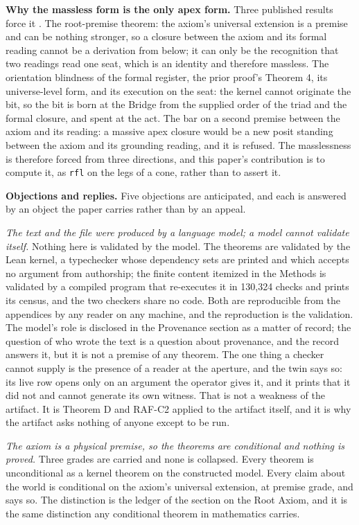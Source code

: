 \documentclass[10pt,twocolumn]{article}
\begin{document}
\textbf{Why the massless form is the only apex form.} Three published
results force it \cite{islamcodex, islamraf}. The root-premise theorem:
the axiom's universal extension is a premise and can be nothing
stronger, so a closure between the axiom and its formal reading cannot
be a derivation from below; it can only be the recognition that two
readings read one seat, which is an identity and therefore massless. The
orientation blindness of the formal register, the prior proof's Theorem
4, its universe-level form, and its execution on the seat: the kernel
cannot originate the bit, so the bit is born at the Bridge from the
supplied order of the triad and the formal closure, and spent at the
act. The bar on a second premise between the axiom and its reading: a
massive apex closure would be a new posit standing between the axiom and
its grounding reading, and it is refused. The masslessness is therefore
forced from three directions, and this paper's contribution is to
compute it, as \texttt{rfl} on the legs of a cone, rather than to assert
it.

\textbf{Objections and replies.} Five objections are anticipated, and
each is answered by an object the paper carries rather than by an
appeal.

\emph{The text and the file were produced by a language model; a model
cannot validate itself.} Nothing here is validated by the model. The
theorems are validated by the Lean kernel, a typechecker whose
dependency sets are printed and which accepts no argument from
authorship; the finite content itemized in the Methods is validated by a
compiled program that re-executes it in 130,324 checks and prints its
census, and the two checkers share no code. Both are reproducible from
the appendices by any reader on any machine, and the reproduction is the
validation. The model's role is disclosed in the Provenance section as a
matter of record; the question of who wrote the text is a question about
provenance, and the record answers it, but it is not a premise of any
theorem. The one thing a checker cannot supply is the presence of a
reader at the aperture, and the twin says so: its live row opens only on
an argument the operator gives it, and it prints that it did not and
cannot generate its own witness. That is not a weakness of the artifact.
It is Theorem D and RAF-C2 applied to the artifact itself, and it is why
the artifact asks nothing of anyone except to be run.

\emph{The axiom is a physical premise, so the theorems are conditional
and nothing is proved.} Three grades are carried and none is collapsed.
Every theorem is unconditional as a kernel theorem on the constructed
model. Every claim about the world is conditional on the axiom's
universal extension, at premise grade, and says so. The distinction is
the ledger of the section on the Root Axiom, and it is the same
distinction any conditional theorem in mathematics carries.
\end{document}
